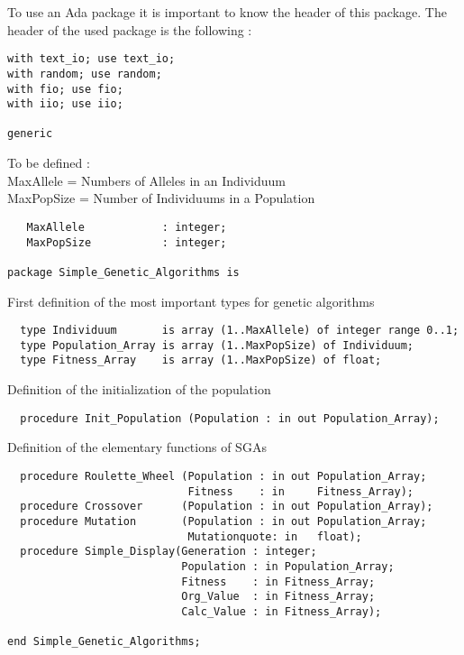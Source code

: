 To use an Ada package it is important to know the header of this package. The
header of the used package is the following :
\begin{verbatim}
with text_io; use text_io;
with random; use random;
with fio; use fio;
with iio; use iio;

generic
\end{verbatim}
{\footnotesize To be defined :\\
MaxAllele = Numbers of Alleles in an Individuum\\
MaxPopSize = Number of Individuums in a Population}
\begin{verbatim}
   MaxAllele            : integer;
   MaxPopSize           : integer;

package Simple_Genetic_Algorithms is
\end{verbatim}
{\footnotesize First definition of the most important types for genetic algorithms}
\begin{verbatim}
  type Individuum       is array (1..MaxAllele) of integer range 0..1;
  type Population_Array is array (1..MaxPopSize) of Individuum;
  type Fitness_Array    is array (1..MaxPopSize) of float;
\end{verbatim}
{\footnotesize Definition of the initialization of the population}
\begin{verbatim}
  procedure Init_Population (Population : in out Population_Array);
\end{verbatim}
{\footnotesize Definition of the elementary functions of SGAs}
\begin{verbatim}
  procedure Roulette_Wheel (Population : in out Population_Array;
                            Fitness    : in     Fitness_Array);
  procedure Crossover      (Population : in out Population_Array);
  procedure Mutation       (Population : in out Population_Array;
                            Mutationquote: in   float);
  procedure Simple_Display(Generation : integer;
                           Population : in Population_Array;
                           Fitness    : in Fitness_Array;
                           Org_Value  : in Fitness_Array;
                           Calc_Value : in Fitness_Array);

end Simple_Genetic_Algorithms;
\end{verbatim}
